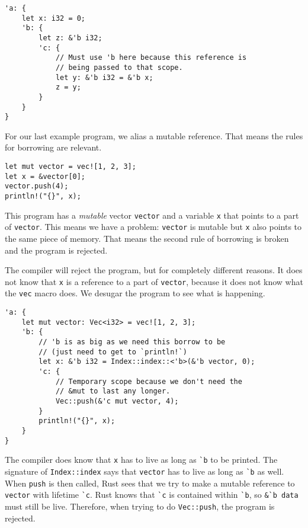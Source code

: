 \begin{verbatim}
'a: {
    let x: i32 = 0;
    'b: {
        let z: &'b i32;
        'c: {
            // Must use 'b here because this reference is
            // being passed to that scope.
            let y: &'b i32 = &'b x;
            z = y;
        }
    }
}
\end{verbatim}

For our last example program, we alias a mutable reference. That means the rules for borrowing are relevant.

\begin{verbatim}
let mut vector = vec![1, 2, 3];
let x = &vector[0];
vector.push(4);
println!("{}", x);
\end{verbatim}

This program has a \textit{mutable} vector \texttt{vector} and a variable \texttt{x} that points to a part of \texttt{vector}. This means we have a problem:  \texttt{vector} is mutable but \texttt{x} also points to the same piece of memory. That means the second rule of borrowing is broken and the program is rejected. 

The compiler will reject the program, but for completely different reasons. It does not know that \texttt{x} is a reference to a part of \texttt{vector}, because it does not know what the \texttt{vec} macro does. We desugar the program to see what is happening.

\begin{verbatim}
'a: {
    let mut vector: Vec<i32> = vec![1, 2, 3];
    'b: {
        // 'b is as big as we need this borrow to be
        // (just need to get to `println!`)
        let x: &'b i32 = Index::index::<'b>(&'b vector, 0);
        'c: {
            // Temporary scope because we don't need the
            // &mut to last any longer.
            Vec::push(&'c mut vector, 4);
        }
        println!("{}", x);
    }
}
\end{verbatim}

The compiler does know that \verb|x| has to live as long as \verb|`b| to be printed. The signature of \verb|Index::index| says that \verb|vector| has to live as long as \verb|`b| as well. When \verb|push| is then called, Rust sees that we try to make a mutable reference to \verb|vector| with lifetime \verb|`c|. Rust knows that \verb|`c| is contained within \verb|`b|, so \verb|&`b data| must still be live. Therefore, when trying to do \verb|Vec::push|, the program is rejected. 
